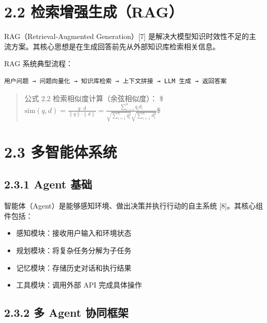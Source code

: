 \documentclass{harryopo-report}
\begin{document}
\section*{2.2 检索增强生成（RAG）}

RAG（Retrieval-Augmented Generation）[7] 是解决大模型知识时效性不足的主流方案。其核心思想是在生成回答前先从外部知识库检索相关信息。

RAG 系统典型流程：

\begin{lstlisting}[style=plainstyle,caption={}]
用户问题 → 问题向量化 → 知识库检索 → 上下文拼接 → LLM 生成 → 返回答案
\end{lstlisting}

\begin{quote}
{\fzht 公式 2.2} 检索相似度计算（余弦相似度）：
\$$\text{sim}(q, d) = \frac{q \cdot d}{\|q\| \cdot \|d\|} = \frac{\sum_{i=1}^{n} q_i d_i}{\sqrt{\sum_{i=1}^{n} q_i^2} \sqrt{\sum_{i=1}^{n} d_i^2}}$\$
\end{quote}

\section*{2.3 多智能体系统}

\subsection*{2.3.1 Agent 基础}

智能体（Agent）是能够感知环境、做出决策并执行行动的自主系统 [8]。其核心组件包括：

\begin{itemize}
  \item {\fzht 感知模块}：接收用户输入和环境状态
  \item {\fzht 规划模块}：将复杂任务分解为子任务
  \item {\fzht 记忆模块}：存储历史对话和执行结果
  \item {\fzht 工具模块}：调用外部 API 完成具体操作
\end{itemize}

\subsection*{2.3.2 多 Agent 协同框架}
\end{document}
